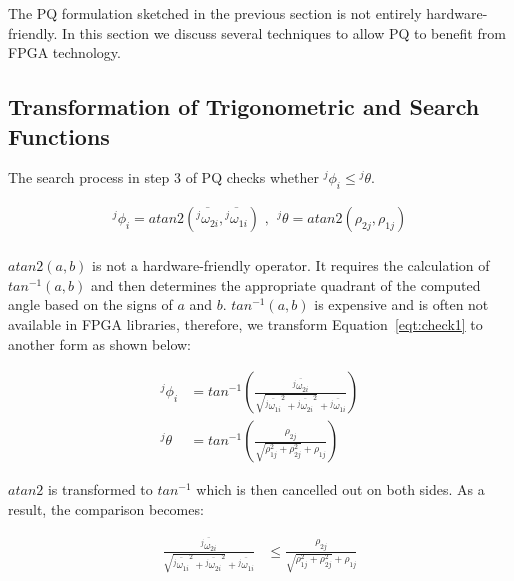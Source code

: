 The PQ formulation sketched in the previous section is not entirely hardware-friendly.
In this section we discuss several techniques to allow PQ to benefit from FPGA technology.

\subsection{Transformation of Trigonometric and Search Functions}
\label{sec:trigo}
The search process in step 3 of PQ checks whether \linebreak ${^j\phi}_i \le {^j\theta}$.

\begin{equation}
\begin{aligned}
{^j\phi}_i = atan2 \left ( \overline{{^j\omega}_{2i}},\overline{{^j\omega}_{1i}} \right ) \mbox{ , } \;
{^j\theta} = atan2 \left ( \rho_{2j},\rho_{1j} \right ) \\
\end{aligned}
\label{eqt:check1}
\end{equation}

$atan2(a,b)$ is not a hardware-friendly operator.
It requires the calculation of $tan^{-1}(a,b)$ and then determines the appropriate quadrant of the computed angle based on the signs of $a$ and $b$.
$tan^{-1}(a,b)$ is expensive and is often not available in FPGA libraries, therefore, we transform Equation~\ref{eqt:check1} to another form as shown below:

\begin{equation}
\begin{aligned}
{^j\phi}_i &= tan^{-1} \left ( \frac{\overline{{^j\omega}_{2i}}}{\sqrt{\overline{{^j\omega}_{1i}}^2+\overline{{^j\omega}_{2i}}^2}+\overline{{^j\omega}_{1i}}} \right )\\
{^j\theta} &= tan^{-1} \left ( \frac{\rho_{2j}}{\sqrt{\rho_{1j}^2+\rho_{2j}^2}+\rho_{1j}} \right ) 
\end{aligned}
\label{eqt:check2}
\end{equation}

$atan2$ is transformed to $tan^{-1}$ which is then cancelled out on both sides.
As a result, the comparison becomes:

\begin{equation}
\begin{aligned}
\frac{\overline{{^j\omega}_{2i}}}{\sqrt{\overline{{^j\omega}_{1i}}^2+\overline{{^j\omega}_{2i}}^2}+\overline{{^j\omega}_{1i}}} &\le \frac{\rho_{2j}}{\sqrt{\rho_{1j}^2+\rho_{2j}^2}+\rho_{1j}}
\end{aligned}
\label{eqt:check3}
\end{equation}

